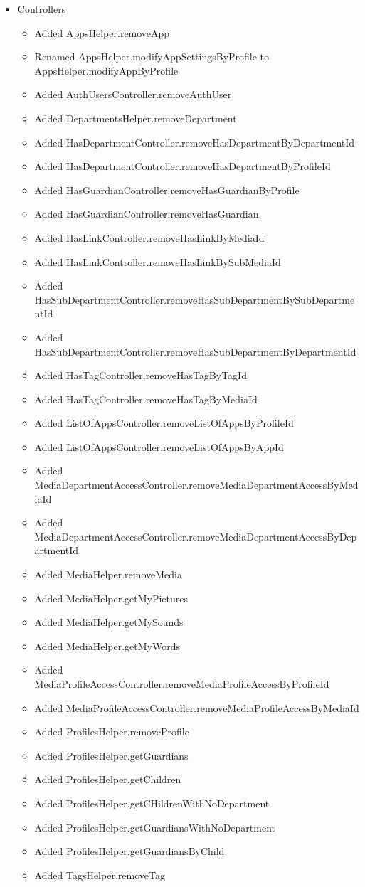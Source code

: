 \begin{itemize}
	\item Controllers
	\begin{itemize}
		\item Added AppsHelper.removeApp
		\item Renamed AppsHelper.modifyAppSettingsByProfile to AppsHelper.modifyAppByProfile
		\item Added AuthUsersController.removeAuthUser
		\item Added DepartmentsHelper.removeDepartment
		\item Added HasDepartmentController.removeHasDepartmentByDepartmentId
		\item Added HasDepartmentController.removeHasDepartmentByProfileId
		\item Added HasGuardianController.removeHasGuardianByProfile
		\item Added HasGuardianController.removeHasGuardian
		\item Added HasLinkController.removeHasLinkByMediaId
		\item Added HasLinkController.removeHasLinkBySubMediaId
		\item Added HasSubDepartmentController.removeHasSubDepartmentBySubDepartmentId
		\item Added HasSubDepartmentController.removeHasSubDepartmentByDepartmentId
		\item Added HasTagController.removeHasTagByTagId
		\item Added HasTagController.removeHasTagByMediaId
		\item Added ListOfAppsController.removeListOfAppsByProfileId
		\item Added ListOfAppsController.removeListOfAppsByAppId
		\item Added MediaDepartmentAccessController.removeMediaDepartmentAccessByMediaId
		\item Added MediaDepartmentAccessController.removeMediaDepartmentAccessByDepartmentId
		\item Added MediaHelper.removeMedia
		\item Added MediaHelper.getMyPictures
		\item Added MediaHelper.getMySounds
		\item Added MediaHelper.getMyWords
		\item Added MediaProfileAccessController.removeMediaProfileAccessByProfileId
		\item Added MediaProfileAccessController.removeMediaProfileAccessByMediaId
		\item Added ProfilesHelper.removeProfile
		\item Added ProfilesHelper.getGuardians
		\item Added ProfilesHelper.getChildren
		\item Added ProfilesHelper.getCHildrenWithNoDepartment
		\item Added ProfilesHelper.getGuardiansWithNoDepartment
		\item Added ProfilesHelper.getGuardiansByChild
		\item Added TagsHelper.removeTag
	\end{itemize}
\end{itemize}

